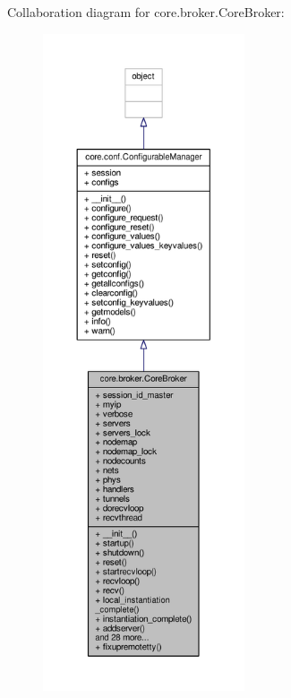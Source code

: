 Collaboration diagram for core.\+broker.\+Core\+Broker\+:
\nopagebreak
\begin{figure}[H]
\begin{center}
\leavevmode
\includegraphics[height=550pt]{classcore_1_1broker_1_1_core_broker__coll__graph}
\end{center}
\end{figure}

